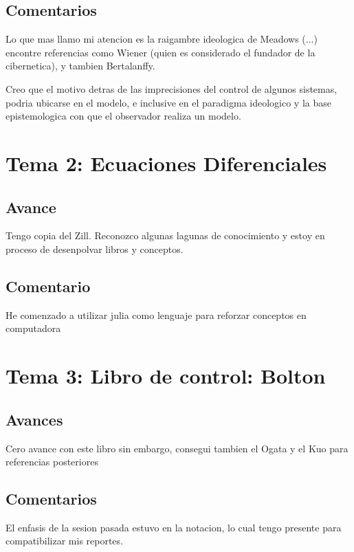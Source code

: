 \documentclass[12pt]{report}
\begin{document}
	\section{Comentarios}
Lo que mas llamo mi atencion es la raigambre ideologica de Meadows (...)
encontre referencias como Wiener (quien es considerado el fundador de la cibernetica), 
y tambien Bertalanffy.

Creo que el motivo detras de las imprecisiones del control de algunos sistemas, podria ubicarse en el modelo, e inclusive en el paradigma ideologico y la base epistemologica con
que el observador realiza un modelo. 
	
	\chapter{Tema 2: Ecuaciones Diferenciales}
	\section{Avance}
	Tengo copia del Zill. Reconozco algunas lagunas de conocimiento y estoy en proceso de desenpolvar
	libros y conceptos.
	
	\section{Comentario	}
He comenzado a utilizar julia como lenguaje para reforzar conceptos en computadora
	
	\chapter{Tema 3: Libro de control: Bolton}
	\section{Avances}

Cero avance con este libro
sin embargo, consegui tambien el Ogata y el Kuo para referencias posteriores

	\section{Comentarios}
El enfasis de la sesion pasada estuvo en la notacion, lo cual tengo presente para
compatibilizar mis reportes.	
\end{document}
